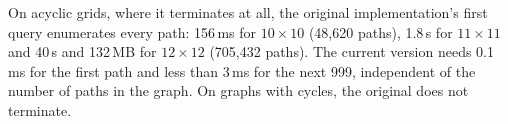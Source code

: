 On acyclic grids, where it terminates at all, the original implementation's first query enumerates every path:
156\,ms for $10\times10$ (48,620 paths), 1.8\,s for $11\times11$ and 40\,s and 132\,MB for $12\times12$ (705,432
paths). The current version needs 0.1\,ms for the first path and less than 3\,ms for the next 999, independent of
the number of paths in the graph. On graphs with cycles, the original does not terminate.
